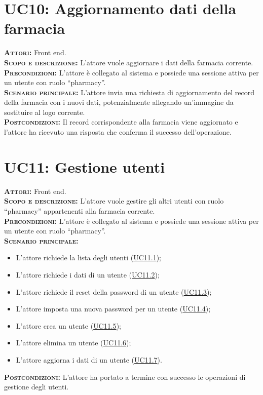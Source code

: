 \section{UC10: Aggiornamento dati della farmacia}
\label{sec:UC10}
\textsc{\textbf{Attori:}} Front end.\\
\textsc{\textbf{Scopo e descrizione:}} L'attore vuole aggiornare i dati della farmacia corrente.\\
\textsc{\textsc{\textbf{Precondizioni:}}} L'attore è collegato al sistema e possiede una sessione attiva per un utente con ruolo ``pharmacy''.\\
\textsc{\textbf{Scenario principale:}} L'attore invia una richiesta di aggiornamento del record della farmacia con i nuovi dati, potenzialmente allegando un'immagine da sostituire al logo corrente.\\
\textsc{\textbf{Postcondizioni:}} Il record corrispondente alla farmacia viene aggiornato e l'attore ha ricevuto una risposta che conferma il successo dell'operazione.

\section{UC11: Gestione utenti}
\label{sec:UC11}
\textsc{\textbf{Attori:}} Front end.\\
\textsc{\textbf{Scopo e descrizione:}} L'attore vuole gestire gli altri utenti con ruolo ``pharmacy'' appartenenti alla farmacia corrente.\\
\textsc{\textsc{\textbf{Precondizioni:}}} L'attore è collegato al sistema e possiede una sessione attiva per un utente con ruolo ``pharmacy''.\\
\textsc{\textbf{Scenario principale:}}
\begin{itemize}
    \item L'attore richiede la lista degli utenti (\hyperref[sec:UC111]{UC11.1});
    \item L'attore richiede i dati di un utente (\hyperref[sec:UC112]{UC11.2});
    \item L'attore richiede il reset della password di un utente (\hyperref[sec:UC113]{UC11.3});
    \item L'attore imposta una nuova password per un utente  (\hyperref[sec:UC114]{UC11.4});
    \item L'attore crea un utente (\hyperref[sec:UC115]{UC11.5});
    \item L'attore elimina un utente (\hyperref[sec:UC116]{UC11.6});
    \item L'attore aggiorna i dati di un utente (\hyperref[sec:UC117]{UC11.7}).
\end{itemize}
\textsc{\textbf{Postcondizioni:}} L'attore ha portato a termine con successo le operazioni di gestione degli utenti.

